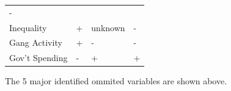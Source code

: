 \documentclass[]{article}
\begin{document}
\begin{longtable}[]{@{}llll@{}}
\begin{minipage}[t]{0.20\columnwidth}
-\strut
\end{minipage}\tabularnewline
\begin{minipage}[t]{0.18\columnwidth}\raggedright
Inequality\strut
\end{minipage} & \begin{minipage}[t]{0.19\columnwidth}\raggedright
+\strut
\end{minipage} & \begin{minipage}[t]{0.31\columnwidth}\raggedright
unknown\strut
\end{minipage} & \begin{minipage}[t]{0.20\columnwidth}\raggedright
-\strut
\end{minipage}\tabularnewline
\begin{minipage}[t]{0.18\columnwidth}\raggedright
Gang Activity\strut
\end{minipage} & \begin{minipage}[t]{0.19\columnwidth}\raggedright
+\strut
\end{minipage} & \begin{minipage}[t]{0.31\columnwidth}\raggedright
-\strut
\end{minipage} & \begin{minipage}[t]{0.20\columnwidth}\raggedright
-\strut
\end{minipage}\tabularnewline
\begin{minipage}[t]{0.18\columnwidth}\raggedright
Gov't Spending\strut
\end{minipage} & \begin{minipage}[t]{0.19\columnwidth}\raggedright
-\strut
\end{minipage} & \begin{minipage}[t]{0.31\columnwidth}\raggedright
+\strut
\end{minipage} & \begin{minipage}[t]{0.20\columnwidth}\raggedright
+\strut
\end{minipage}\tabularnewline
\bottomrule
\end{longtable}

The 5 major identified ommited variables are shown above.
\end{document}

